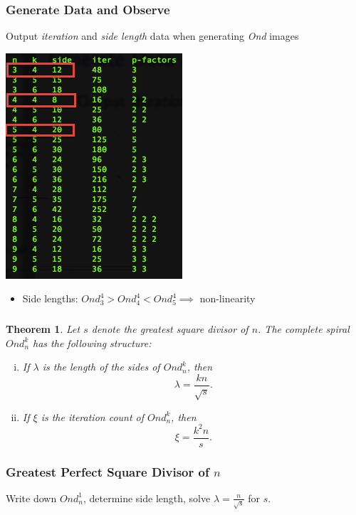\documentclass{beamer}
\theoremstyle{mydef}
\newtheorem{thm}{Theorem}[section]
\begin{document}
\frame
{
 \frametitle{Generate Data and Observe}
  Output \emph{iteration} and \emph{side length} data when generating \emph{Ond} images
  
\begin{center}
\includegraphics[scale=.5]{images/sometab-box.png}
\end{center}

\begin{itemize}
\item Side lengths:  $Ond_3^{4} > Ond_4^{4} < Ond_5^{4}  \implies$ non-linearity
\end{itemize}
}


\frame
{
  \frametitle{}
  \begin{thm}%
\label{lenthm}
\footnotesize
Let $s$ denote the greatest square divisor of $n$.
The complete spiral $Ond^k_n$ has the following structure:
\begin{enumerate}[(i)]
\item If $\lambda$ is the length of the sides of $Ond^k_n$, then
\begin{equation}
  \lambda = \frac{kn}{\sqrt{s}}.
\label{lambda}
\end{equation}
\item If $\xi$ is the iteration count of $Ond^k_n$, then
\begin{equation}
  \xi = \frac{k^2n}{s}.  
\label{xi}
\end{equation}
\end{enumerate}
\end{thm}
}

\frame
{
  \frametitle{Greatest Perfect Square Divisor of $n$}
  
  Write down $Ond_n^1$, determine side length, solve $\lambda = \frac{n}{\sqrt{s}}$ for $s$.
}
\end{document}
